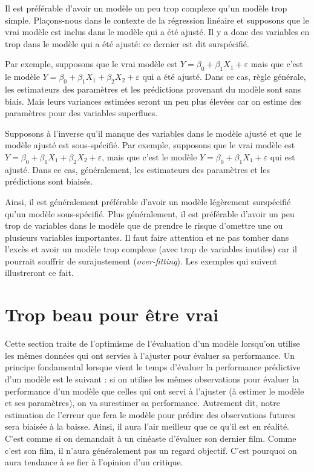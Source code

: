 \documentclass[
  11pt,
  letterpaper,
]{book}
\theoremstyle{definition}
\theoremstyle{definition}
\theoremstyle{definition}
\theoremstyle{definition}
\theoremstyle{remark}
\begin{document}
Il est préférable d'avoir un modèle un peu trop complexe qu'un modèle trop simple. Plaçons-nous dans le contexte de la régression linéaire et supposons que le vrai modèle est inclus dans le modèle qui a été ajusté. Il y a donc des variables en trop dans le modèle qui a été ajusté: ce dernier est dit surspécifié.

Par exemple, supposons que le vrai modèle est \(Y=\beta_0+\beta_1X_1+\varepsilon\) mais que c'est le modèle \(Y=\beta_0+\beta_1X_1+\beta_2X_2+\varepsilon\) qui a été ajusté. Dans ce cas, règle générale, les estimateurs des paramètres et les prédictions provenant du modèle sont sans biais. Mais leurs variances estimées seront un peu plus élevées car on estime des paramètres pour des variables superflues.

Supposons à l'inverse qu'il manque des variables dans le modèle ajusté et que le modèle ajusté est sous-spécifié. Par exemple, supposons que le vrai modèle est \(Y=\beta_0+\beta_1X_1+\beta_2X_2+\varepsilon\), mais que c'est le modèle \(Y=\beta_0+\beta_1X_1+\varepsilon\) qui est ajusté. Dans ce cas, généralement, les estimateurs des paramètres et les prédictions sont biaisés.

Ainsi, il est généralement préférable d'avoir un modèle légèrement surspécifié qu'un modèle sous-spécifié. Plus généralement, il est préférable d'avoir un peu trop de variables dans le modèle que de prendre le risque d'omettre une ou plusieurs variables importantes. Il faut faire attention et ne pas tomber dans l'excès et avoir un modèle trop complexe (avec trop de variables inutiles) car il pourrait souffrir de surajustement (\emph{over-fitting}). Les exemples qui suivent illustreront ce fait.

\hypertarget{trop-beau-pour-uxeatre-vrai}{%
\section{Trop beau pour être vrai}\label{trop-beau-pour-uxeatre-vrai}}

Cette section traite de l'optimisme de l'évaluation d'un modèle lorsqu'on utilise les mêmes données qui ont servies à l'ajuster pour évaluer sa performance. Un principe fondamental lorsque vient le temps d'évaluer la performance prédictive d'un modèle est le suivant : si on utilise les mêmes observations pour évaluer la performance d'un modèle que celles qui ont servi à l'ajuster (à estimer le modèle et ses paramètres), on va surestimer sa performance. Autrement dit, notre estimation de l'erreur que fera le modèle pour prédire des observations futures sera biaisée à la baisse. Ainsi, il aura l'air meilleur que ce qu'il est en réalité. C'est comme si on demandait à un cinéaste d'évaluer son dernier film. Comme c'est son film, il n'aura généralement pas un regard objectif. C'est pourquoi on aura tendance à se fier à l'opinion d'un critique.
\end{document}
